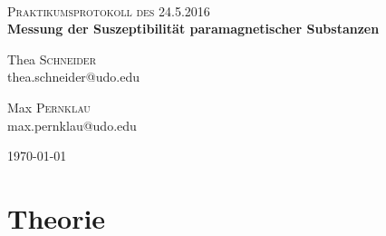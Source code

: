 

\newcommand{\HRule}{\rule{\linewidth}{0.5mm}}


\begin{titlepage}
\begin{center}

~\\[1cm]


\textsc{\Large Praktikumsprotokoll des 24.5.2016}\\

\huge{ \bfseries Messung der Suszeptibilität paramagnetischer Substanzen}\\[1em]


\begin{minipage}{0.4\textwidth}
\begin{flushleft} \large
Thea \textsc{Schneider}\\
thea.schneider@udo.edu
\end{flushleft}
\end{minipage}
\begin{minipage}{0.4\textwidth}
\begin{flushright} \large
Max \textsc{Pernklau}\\
max.pernklau@udo.edu
\end{flushright}
\end{minipage}

\vfill

{\large \today}

\end{center}
\end{titlepage}


\thispagestyle{empty}



\begingroup
\renewcommand{\clearpage}{}
\section{Theorie}
\label{sec:Theorie}
\endgroup








